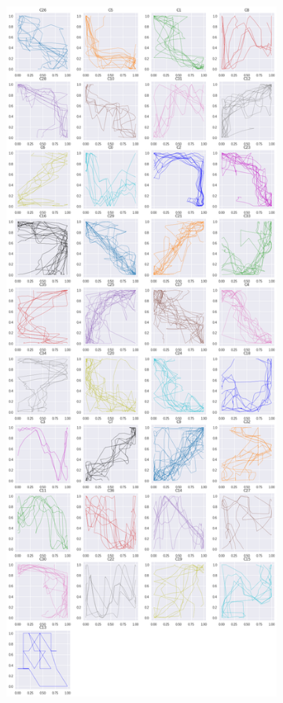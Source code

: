 \begin{figure}[h]
  \centering
  \hspace{.5em}
   \begin{subfigure}[c]{0.35\linewidth}
     \includegraphics[width=\linewidth]{figs/clusters/CLU_AP_ALL[MSM;c=.1].png}

\end{subfigure}
\end{figure}
